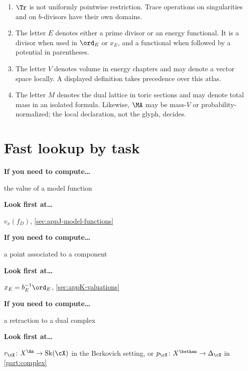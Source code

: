 \begin{enumerate}
\item \(\Tr\) is not uniformly pointwise restriction.  Trace operations on
  singularities and on \(b\)-divisors have their own domains.

\item The letter \(E\) denotes either a prime divisor or an energy
  functional.  It is a divisor when used in \(\ord_E\) or \(x_E\), and a
  functional when followed by a potential in parentheses.

\item The letter \(V\) denotes volume in energy chapters and may denote a
  vector space locally.  A displayed definition takes precedence over this
  atlas.

\item The letter \(M\) denotes the dual lattice in toric sections and may
  denote total mass in an isolated formula.  Likewise, \(\MA\) may be
  mass-\(V\) or probability-normalized; the local declaration, not the
  glyph, decides.
\end{enumerate}

\section{Fast lookup by task}
\label{sec:appK-fast}

\begingroup
\setlength{\parindent}{0pt}

\textbf{If you need to compute\ldots}\par\nopagebreak
the value of a model function\par\nopagebreak

\textbf{Look first at\ldots}\par\nopagebreak
\(v_x(f_D)\), \cref{sec:appJ-model-functions}

\medskip
\textbf{If you need to compute\ldots}\par\nopagebreak
a point associated to a component\par\nopagebreak

\textbf{Look first at\ldots}\par\nopagebreak
\(x_E=b_E^{-1}\ord_E\), \cref{sec:appK-valuations}

\medskip
\textbf{If you need to compute\ldots}\par\nopagebreak
a retraction to a dual complex\par\nopagebreak

\textbf{Look first at\ldots}\par\nopagebreak
\(r_\cX\colon X^{\An}\to\operatorname{Sk}(\cX)\) in the Berkovich
setting, or \(p_\cX\colon X^{\bethan}\to\Delta_\cX\) in
\cref{part:complex}

